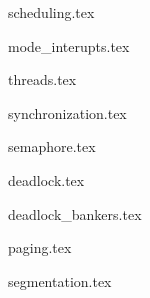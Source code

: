 
{scheduling.tex}           \newpage

{mode_interupts.tex}       \newpage

{threads.tex}              \newpage

{synchronization.tex}      \newpage

{semaphore.tex}            \newpage

{deadlock.tex}            \newpage

{deadlock_bankers.tex}    \newpage\newpage

{paging.tex}              \newpage\newpage

{segmentation.tex}        \newpage

